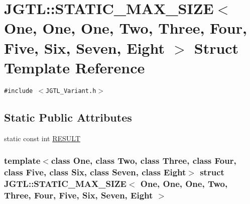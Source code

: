 \hypertarget{struct_j_g_t_l_1_1_s_t_a_t_i_c___m_a_x___s_i_z_e_3_01_one_00_01_one_00_01_one_00_01_two_00_01_the35ecf7c7360ce295a7d197f78c1831e}{
\section{JGTL::STATIC\_\-MAX\_\-SIZE$<$ One, One, One, Two, Three, Four, Five, Six, Seven, Eight $>$ Struct Template Reference}
\label{struct_j_g_t_l_1_1_s_t_a_t_i_c___m_a_x___s_i_z_e_3_01_one_00_01_one_00_01_one_00_01_two_00_01_the35ecf7c7360ce295a7d197f78c1831e}
}
{\tt \#include $<$JGTL\_\-Variant.h$>$}

\subsection*{Static Public Attributes}
\begin{CompactItemize}
\item 
static const int \hyperlink{struct_j_g_t_l_1_1_s_t_a_t_i_c___m_a_x___s_i_z_e_3_01_one_00_01_one_00_01_one_00_01_two_00_01_the35ecf7c7360ce295a7d197f78c1831e_ab017edead1f631410aa8bb17d530a69}{RESULT}
\end{CompactItemize}
\subsubsection*{template$<$class One, class Two, class Three, class Four, class Five, class Six, class Seven, class Eight$>$ struct JGTL::STATIC\_\-MAX\_\-SIZE$<$ One, One, One, Two, Three, Four, Five, Six, Seven, Eight $>$}



